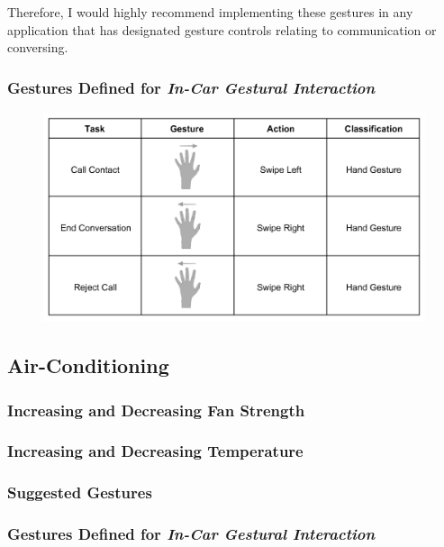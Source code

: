 \documentclass{l4proj}
\begin{document}
Therefore, I would highly recommend implementing these gestures in any application that has designated gesture controls relating to communication or conversing. 

\subsubsection{Gestures Defined for \textbf{\textit{In-Car Gestural Interaction}}}
\vspace{-3mm}
\begin{figure}[h!]
\centering
\includegraphics[width=6in]{images/LeapContactGestures.png}
\label{fig:leapcontacts}
\end{figure}

\subsection{Air-Conditioning}
\vspace{-3mm}
\subsubsection{Increasing and Decreasing Fan Strength}
\vspace{-3mm}
\subsubsection{Increasing and Decreasing Temperature}
\vspace{-3mm}
\subsubsection{Suggested Gestures}
\vspace{-3mm}
\subsubsection{Gestures Defined for \it{In-Car Gestural Interaction}}
\vspace{-3mm}
\end{document}
